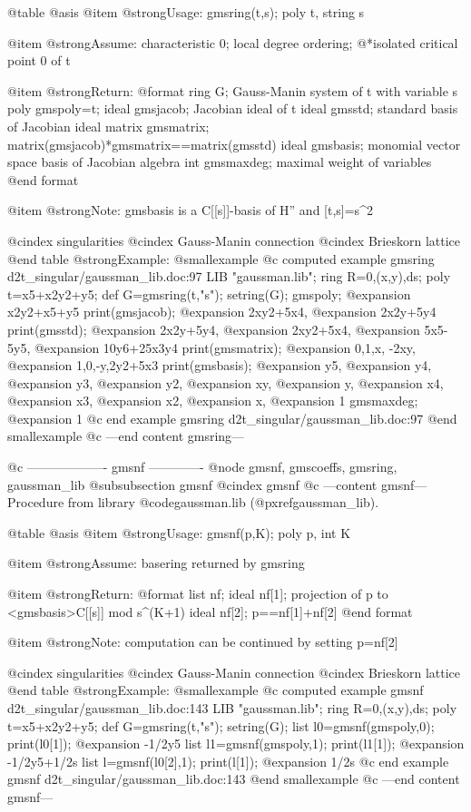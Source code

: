 @table @asis
@item @strong{Usage:}
gmsring(t,s); poly t, string s

@item @strong{Assume:}
characteristic 0; local degree ordering;
@*isolated critical point 0 of t

@item @strong{Return:}
@format
ring G;  Gauss-Manin system of t with variable s
  poly gmspoly=t;
  ideal gmsjacob;  Jacobian ideal of t
  ideal gmsstd;  standard basis of Jacobian ideal
  matrix gmsmatrix;  matrix(gmsjacob)*gmsmatrix==matrix(gmsstd)
  ideal gmsbasis;  monomial vector space basis of Jacobian algebra
  int gmsmaxdeg;  maximal weight of variables
@end format

@item @strong{Note:}
gmsbasis is a C[[s]]-basis of H'' and [t,s]=s^2

@cindex singularities
@cindex Gauss-Manin connection
@cindex Brieskorn lattice
@end table
@strong{Example:}
@smallexample
@c computed example gmsring d2t_singular/gaussman_lib.doc:97 
LIB "gaussman.lib";
ring R=0,(x,y),ds;
poly t=x5+x2y2+y5;
def G=gmsring(t,"s");
setring(G);
gmspoly;
@expansion{} x2y2+x5+y5
print(gmsjacob);
@expansion{} 2xy2+5x4,
@expansion{} 2x2y+5y4
print(gmsstd);
@expansion{} 2x2y+5y4,
@expansion{} 2xy2+5x4,
@expansion{} 5x5-5y5,
@expansion{} 10y6+25x3y4
print(gmsmatrix);
@expansion{} 0,1,x, -2xy,  
@expansion{} 1,0,-y,2y2+5x3
print(gmsbasis);
@expansion{} y5,
@expansion{} y4,
@expansion{} y3,
@expansion{} y2,
@expansion{} xy,
@expansion{} y,
@expansion{} x4,
@expansion{} x3,
@expansion{} x2,
@expansion{} x,
@expansion{} 1
gmsmaxdeg;
@expansion{} 1
@c end example gmsring d2t_singular/gaussman_lib.doc:97
@end smallexample
@c ---end content gmsring---

@c ------------------- gmsnf -------------
@node gmsnf, gmscoeffs, gmsring, gaussman_lib
@subsubsection gmsnf
@cindex gmsnf
@c ---content gmsnf---
Procedure from library @code{gaussman.lib} (@pxref{gaussman_lib}).

@table @asis
@item @strong{Usage:}
gmsnf(p,K); poly p, int K

@item @strong{Assume:}
basering returned by gmsring

@item @strong{Return:}
@format
list nf;
  ideal nf[1];  projection of p to <gmsbasis>C[[s]] mod s^(K+1)
  ideal nf[2];  p==nf[1]+nf[2]
@end format

@item @strong{Note:}
computation can be continued by setting p=nf[2]

@cindex singularities
@cindex Gauss-Manin connection
@cindex Brieskorn lattice
@end table
@strong{Example:}
@smallexample
@c computed example gmsnf d2t_singular/gaussman_lib.doc:143 
LIB "gaussman.lib";
ring R=0,(x,y),ds;
poly t=x5+x2y2+y5;
def G=gmsring(t,"s");
setring(G);
list l0=gmsnf(gmspoly,0);
print(l0[1]);
@expansion{} -1/2y5
list l1=gmsnf(gmspoly,1);
print(l1[1]);
@expansion{} -1/2y5+1/2s
list l=gmsnf(l0[2],1);
print(l[1]);
@expansion{} 1/2s
@c end example gmsnf d2t_singular/gaussman_lib.doc:143
@end smallexample
@c ---end content gmsnf---

